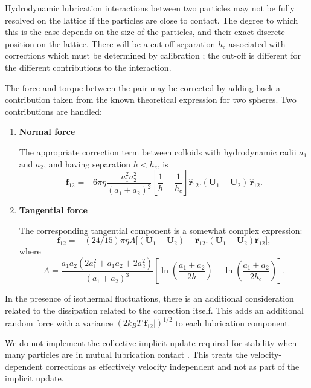 Hydrodynamic lubrication interactions between two particles may
not be fully resolved on the lattice if the particles are close
to contact. The degree to which this is the case depends on the
size of the particles, and their exact discrete position on the
lattice. There will be a cut-off separation $h_c$ associated
with corrections which must be determined by calibration
\cite{nguyen-ladd2002}; the cut-off is different for the
different contributions to the interaction.

The force and torque between the pair may be corrected
by adding back a contribution taken from the known theoretical
expression for two spheres. Two contributions are handled:

\begin{enumerate}
\item {\bf Normal force}

The appropriate correction term between colloids with hydrodynamic
radii $a_1$ and $a_2$, and having separation $h < h_c$, is
\begin{equation}
\mathbf{f}_{12} = -6\pi\eta \frac{ a_1^2 a_2^2}{(a_1 + a_2)^2}
\left[ \frac{1}{h} - \frac{1}{h_c} \right]
\hat{\mathbf{r}}_{12}. ( \mathbf{U}_1 - \mathbf{U}_2)\,
\hat{\mathbf{r}}_{12}.
\end{equation}

\item
{\bf Tangential force}

The corresponding tangential component is a somewhat complex
expression:
\begin{equation}
\mathbf{f}_{12} =
-(24/15) \pi\eta A
\big[
(\mathbf{U}_1 - \mathbf{U}_2)
-  \hat{\mathbf{r}}_{12} . (\mathbf{U}_1 - \mathbf{U}_2) \hat{\mathbf{r}}_{12}
\big],
\end{equation}
where
\begin{equation}
A = \frac{a_1 a_2 (2a_1^2 + a_1 a_2 + 2a_2^2)}{(a_1 + a_2)^3}
\left[
\ln\!\left(\frac{a_1 + a_2}{2h}\right)
- \ln\!\left(\frac{a_1 + a_2}{2h_c}\right)
\right].
\nonumber
\end{equation}
\end{enumerate}


In the presence of isothermal fluctuations, there is an additional
consideration related to the dissipation related to the correction
itself. This adds an additional random force with a variance
$(2k_BT |\mathbf{f}_{12}|)^{1/2}$ to each lubrication component.


We do not implement the collective implicit update required for
stability when many particles are in mutual lubrication contact
\cite{nguyen-ladd2002}. This treats the velocity-dependent
corrections as effectively velocity independent and not as part
of the implicit update.

